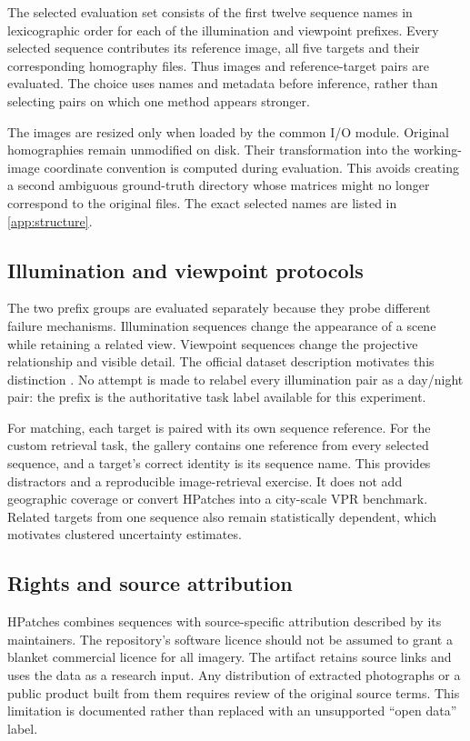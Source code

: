 The selected evaluation set consists of the first twelve sequence names in lexicographic order for each of the illumination and viewpoint prefixes. Every selected sequence contributes its reference image, all five targets and their corresponding homography files. Thus \HpImages{} images and \HpPairs{} reference-target pairs are evaluated. The choice uses names and metadata before inference, rather than selecting pairs on which one method appears stronger.

The images are resized only when loaded by the common I/O module. Original homographies remain unmodified on disk. Their transformation into the working-image coordinate convention is computed during evaluation. This avoids creating a second ambiguous ground-truth directory whose matrices might no longer correspond to the original files. \ifFullReport The exact selected names are listed in \cref{app:structure}.\fi

\subsection{Illumination and viewpoint protocols}
The two prefix groups are evaluated separately because they probe different failure mechanisms. Illumination sequences change the appearance of a scene while retaining a related view. Viewpoint sequences change the projective relationship and visible detail. The official dataset description motivates this distinction \citep{balntas2017,hpatchesrepo}. No attempt is made to relabel every illumination pair as a day/night pair: the prefix is the authoritative task label available for this experiment.

For matching, each target is paired with its own sequence reference. For the custom retrieval task, the gallery contains one reference from every selected sequence, and a target's correct identity is its sequence name. This provides distractors and a reproducible image-retrieval exercise. It does not add geographic coverage or convert HPatches into a city-scale VPR benchmark. Related targets from one sequence also remain statistically dependent, which motivates clustered uncertainty estimates.

\subsection{Rights and source attribution}
HPatches combines sequences with source-specific attribution described by its maintainers. The repository's software licence should not be assumed to grant a blanket commercial licence for all imagery. The artifact retains source links and uses the data as a research input. Any distribution of extracted photographs or a public product built from them requires review of the original source terms. This limitation is documented rather than replaced with an unsupported ``open data'' label.

